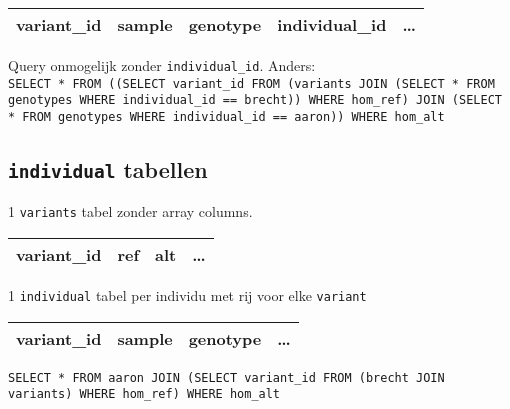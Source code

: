 \documentclass{article}
\begin{document}
\begin{table}[!htbp]
\begin{tabular}{@{}|l|l|l|l|l|@{}}
\toprule
variant\_id & sample & genotype & \color{red} individual\_id & \ldots \\ \bottomrule
\end{tabular}
\end{table}

Query onmogelijk zonder \texttt{individual\_id}. Anders:\\
\texttt{SELECT * FROM ((SELECT variant\_id FROM (variants JOIN (SELECT * FROM genotypes WHERE individual\_id == brecht)) WHERE hom\_ref) JOIN (SELECT * FROM genotypes WHERE individual\_id == aaron)) WHERE hom\_alt}

\subsection{\texttt{individual} tabellen} 

1 \texttt{variants} tabel zonder array columns.

\begin{table}[!htbp]
\begin{tabular}{@{}|l|l|l|l|@{}}
\toprule
variant\_id & ref & alt & \ldots \\ \bottomrule
\end{tabular}
\end{table}

1 \texttt{individual} tabel per individu met rij voor elke \texttt{variant}

\begin{table}[!htbp]
\begin{tabular}{@{}|l|l|l|l|@{}}
\toprule
variant\_id & sample & genotype & \ldots \\ \bottomrule
\end{tabular}
\end{table}

\texttt{SELECT * FROM aaron JOIN (SELECT variant\_id FROM (brecht JOIN variants) WHERE hom\_ref) WHERE hom\_alt }
\end{document}
